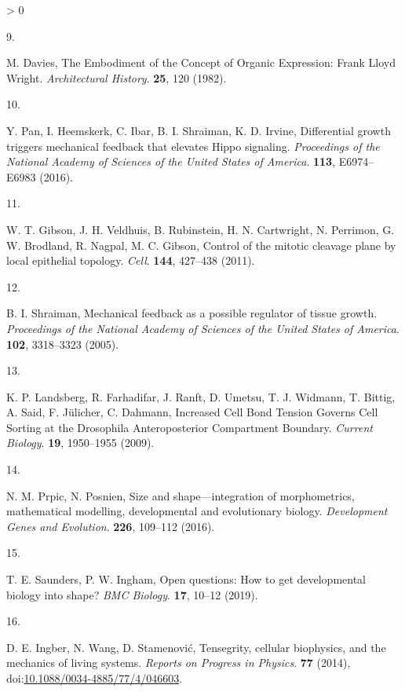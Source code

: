 \documentclass[10pt, b5paper, singlespacinge, twoside]{reedthesis} %
\newlength{\cslhangindent}
\newlength{\csllabelwidth}
\newenvironment{CSLReferences}[3] %
  {%
    \setlength{\parindent}{0pt}
    \ifodd #1 \everypar{\setlength{\hangindent}{\cslhangindent}}\ignorespaces\fi
    \ifnum #2 > 0
    \setlength{\parskip}{#2\baselineskip}
    \fi
  }%
  {}
\newcommand{\CSLLeftMargin}[1]{\parbox[t]{\maxof{\widthof{#1}}{\csllabelwidth}}{#1}}
\newcommand{\CSLRightInline}[1]{\parbox[t]{\linewidth}{#1}}
\theoremstyle{definition}
\theoremstyle{definition}
\theoremstyle{definition}
\theoremstyle{remark}
\begin{document}
\begin{CSLReferences}{0}{0}
\leavevmode\hypertarget{ref-Davies1982}{}%
\CSLLeftMargin{9. }
\CSLRightInline{M. Davies, {The Embodiment of the Concept of Organic Expression: Frank Lloyd Wright}. \emph{Architectural History}. \textbf{25}, 120 (1982).}

\leavevmode\hypertarget{ref-Pan2016}{}%
\CSLLeftMargin{10. }
\CSLRightInline{Y. Pan, I. Heemskerk, C. Ibar, B. I. Shraiman, K. D. Irvine, {Differential growth triggers mechanical feedback that elevates Hippo signaling}. \emph{Proceedings of the National Academy of Sciences of the United States of America}. \textbf{113}, E6974--E6983 (2016).}

\leavevmode\hypertarget{ref-Gibson2011}{}%
\CSLLeftMargin{11. }
\CSLRightInline{W. T. Gibson, J. H. Veldhuis, B. Rubinstein, H. N. Cartwright, N. Perrimon, G. W. Brodland, R. Nagpal, M. C. Gibson, {Control of the mitotic cleavage plane by local epithelial topology}. \emph{Cell}. \textbf{144}, 427--438 (2011).}

\leavevmode\hypertarget{ref-Shraiman2005}{}%
\CSLLeftMargin{12. }
\CSLRightInline{B. I. Shraiman, {Mechanical feedback as a possible regulator of tissue growth}. \emph{Proceedings of the National Academy of Sciences of the United States of America}. \textbf{102}, 3318--3323 (2005).}

\leavevmode\hypertarget{ref-Landsberg2009}{}%
\CSLLeftMargin{13. }
\CSLRightInline{K. P. Landsberg, R. Farhadifar, J. Ranft, D. Umetsu, T. J. Widmann, T. Bittig, A. Said, F. Jülicher, C. Dahmann, {Increased Cell Bond Tension Governs Cell Sorting at the Drosophila Anteroposterior Compartment Boundary}. \emph{Current Biology}. \textbf{19}, 1950--1955 (2009).}

\leavevmode\hypertarget{ref-Prpic2016}{}%
\CSLLeftMargin{14. }
\CSLRightInline{N. M. Prpic, N. Posnien, {Size and shape---integration of morphometrics, mathematical modelling, developmental and evolutionary biology}. \emph{Development Genes and Evolution}. \textbf{226}, 109--112 (2016).}

\leavevmode\hypertarget{ref-Saunders2019}{}%
\CSLLeftMargin{15. }
\CSLRightInline{T. E. Saunders, P. W. Ingham, {Open questions: How to get developmental biology into shape?} \emph{BMC Biology}. \textbf{17}, 10--12 (2019).}

\leavevmode\hypertarget{ref-Ingber2014}{}%
\CSLLeftMargin{16. }
\CSLRightInline{D. E. Ingber, N. Wang, D. Stamenović, {Tensegrity, cellular biophysics, and the mechanics of living systems}. \emph{Reports on Progress in Physics}. \textbf{77} (2014), doi:\href{https://doi.org/10.1088/0034-4885/77/4/046603}{10.1088/0034-4885/77/4/046603}.}


\end{CSLReferences}
\end{document}
